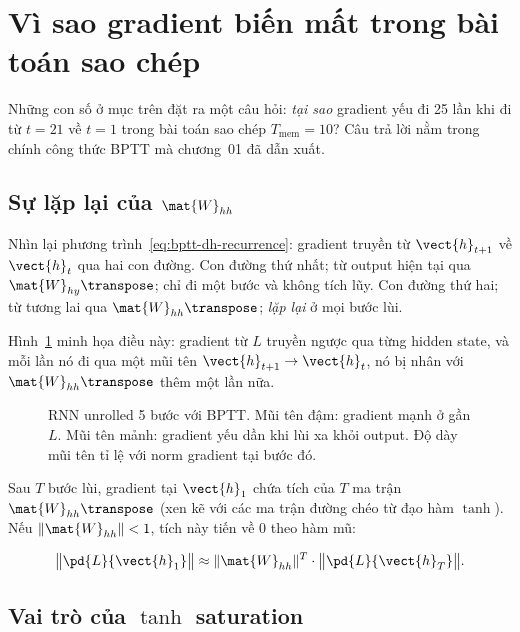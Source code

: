 %

\section{Vì sao gradient biến mất trong bài toán sao chép}
\label{sec:ch02-vi-sao}

Những con số ở mục trên đặt ra một câu hỏi: \emph{tại sao} gradient yếu đi 25
lần khi đi từ $t = 21$ về $t = 1$ trong bài toán sao chép $T_{\text{mem}} =
10$? Câu trả lời nằm trong chính công thức BPTT mà chương~01 đã dẫn xuất.

\subsection{Sự lặp lại của $\mat{W}_{hh}$}

Nhìn lại phương trình~\eqref{eq:bptt-dh-recurrence}: gradient truyền từ
$\vect{h}_{t+1}$ về $\vect{h}_t$ qua hai con đường. Con đường thứ nhất; từ
output hiện tại qua $\mat{W}_{hy}\transpose$; chỉ đi một bước và không tích
lũy. Con đường thứ hai; từ tương lai qua $\mat{W}_{hh}\transpose$; \emph{lặp
lại} ở mọi bước lùi.

Hình~\ref{fig:ch02-rnn-gradient} minh họa điều này: gradient từ $L$ truyền
ngược qua từng hidden state, và mỗi lần nó đi qua một mũi tên $\vect{h}_{t+1}
\to \vect{h}_t$, nó bị nhân với $\mat{W}_{hh}\transpose$ thêm một lần nữa.

\begin{figure}[ht]
  \centering
  
  \caption{RNN unrolled 5 bước với BPTT. Mũi tên đậm: gradient mạnh ở gần $L$.
    Mũi tên mảnh: gradient yếu dần khi lùi xa khỏi output. Độ dày mũi tên tỉ
    lệ với norm gradient tại bước đó.}
  \label{fig:ch02-rnn-gradient}
\end{figure}

Sau $T$ bước lùi, gradient tại $\vect{h}_1$ chứa tích của $T$ ma trận
$\mat{W}_{hh}\transpose$ (xen kẽ với các ma trận đường chéo từ đạo hàm
$\tanh$). Nếu $\|\mat{W}_{hh}\| < 1$, tích này tiến về 0 theo hàm mũ:

\[
\bigl\|\pd{L}{\vect{h}_1}\bigr\|
\approx \|\mat{W}_{hh}\|^T \cdot \bigl\|\pd{L}{\vect{h}_T}\bigr\|.
\]

\subsection{Vai trò của $\tanh$ saturation}


